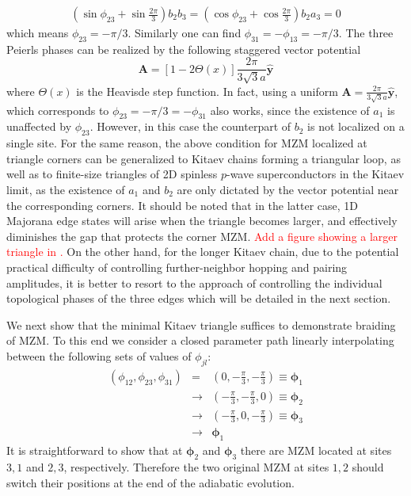 \documentclass[aps,prb,showpacs,amsmath,twocolumn,amssymb,superscriptaddress]{revtex4-2}
\newcommand{\Red}[1]{\textcolor{red}{#1}}
\let\oldhat\hat
\renewcommand{\hat}[1]{\oldhat{\mathbf{#1}}}
\renewcommand{\vec}[1]{\mathbf{#1}}
\begin{document}
\begin{align}
  \left(\sin\phi_{23} + \sin\frac{2\pi}{3}\right) b_2 b_3 =\left(\cos\phi_{23} + \cos\frac{2\pi}{3}\right)b_2 a_3 = 0
\end{align}
which means $\phi_{23} = -\pi/3$. Similarly one can find $\phi_{31} =-\phi_{13} = -\pi/3$. The three Peierls phases can be realized by the following staggered vector potential
\begin{equation}\label{eq:Astep}
  \vec{A} =\left[1-2\Theta(x)\right]\frac{2 \pi}{3\sqrt{3}a} \hat{y} 
\end{equation}
where $\Theta(x)$ is the Heavisde step function. In fact, using a uniform $\vec{A} =\frac{2 \pi}{3\sqrt{3}a} \hat{y}$, which corresponds to $\phi_{23} = -\pi/3 = -\phi_{31}$ also works, since the existence of $a_1$ is unaffected by $\phi_{23}$. However, in this case the counterpart of $b_2$ is not localized on a single site. For the same reason, the above condition for MZM localized at triangle corners can be generalized to Kitaev chains forming a triangular loop, as well as to finite-size triangles of 2D spinless $p$-wave superconductors in the Kitaev limit, as the existence of $a_1$ and $b_2$ are only dictated by the vector potential near the corresponding corners. It should be noted that in the latter case, 1D Majorana edge states will arise when the triangle becomes larger, and effectively diminishes the gap that protects the corner MZM. \Red{Add a figure showing a larger triangle in \cite{supp}.} On the other hand, for the longer Kitaev chain, due to the potential practical difficulty of controlling further-neighbor hopping and pairing amplitudes, it is better to resort to the approach of controlling the individual topological phases of the three edges which will be detailed in the next section. 

We next show that the minimal Kitaev triangle suffices to demonstrate braiding of MZM. To this end we consider a closed parameter path linearly interpolating between the following sets of values of $\phi_{jl}$:
\begin{eqnarray}
    (\phi_{12},\phi_{23},\phi_{31}) &=& \left(0,-\frac{\pi}{3},-\frac{\pi}{3}\right ) \equiv \bm \phi_1 \\\nonumber
    &\rightarrow& \left(-\frac{\pi}{3},-\frac{\pi}{3},0 \right) \equiv \bm \phi_2 \\\nonumber
    &\rightarrow& \left(-\frac{\pi}{3},0,-\frac{\pi}{3} \right) \equiv \bm \phi_3 \\\nonumber
    &\rightarrow& \bm \phi_1
\end{eqnarray}
It is straightforward to show that at $\bm \phi_{2}$ and $\bm \phi_3$ there are MZM located at sites $3,1$ and $2,3$, respectively. Therefore the two original MZM at sites $1,2$ should switch their positions at the end of the adiabatic evolution. 
\end{document}

